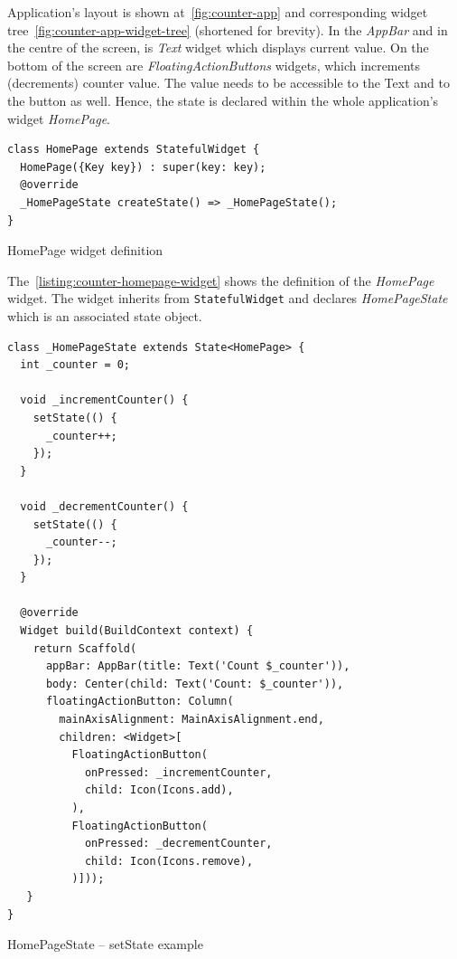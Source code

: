 Application's layout is shown at~\cref{fig:counter-app} and corresponding widget tree~\cref{fig:counter-app-widget-tree} (shortened for brevity). In the \textit{AppBar} and in the centre of the screen, is \textit{Text} widget which displays current value. On the bottom of the screen are \textit{FloatingActionButtons} widgets, which increments (decrements) counter value. The value needs to be accessible to the Text and to the button as well. Hence, the state is declared within the whole application's widget \textit{HomePage}.  

\begin{listing}[ht]
\begin{verbatim}
class HomePage extends StatefulWidget {
  HomePage({Key key}) : super(key: key);
  @override
  _HomePageState createState() => _HomePageState();
}
\end{verbatim}
\caption{HomePage widget definition}
\label{listing:counter-homepage-widget}
\end{listing}

The~\cref{listing:counter-homepage-widget} shows the definition of the \textit{HomePage} widget. The widget inherits from \verb|StatefulWidget| and declares \textit{HomePageState} which is an associated state object.

\begin{listing}[ht]
\begin{verbatim}
class _HomePageState extends State<HomePage> {
  int _counter = 0;

  void _incrementCounter() {
    setState(() {
      _counter++;
    });
  }

  void _decrementCounter() {
    setState(() {
      _counter--;
    });
  }

  @override
  Widget build(BuildContext context) {
    return Scaffold(
      appBar: AppBar(title: Text('Count $_counter')),
      body: Center(child: Text('Count: $_counter')),
      floatingActionButton: Column(
        mainAxisAlignment: MainAxisAlignment.end,
        children: <Widget>[
          FloatingActionButton(
            onPressed: _incrementCounter,
            child: Icon(Icons.add),
          ),
          FloatingActionButton(
            onPressed: _decrementCounter,
            child: Icon(Icons.remove),
          )]));
   }
}
\end{verbatim}
\caption{HomePageState -- setState example}
\label{listing:counter-base-state}
\end{listing}

